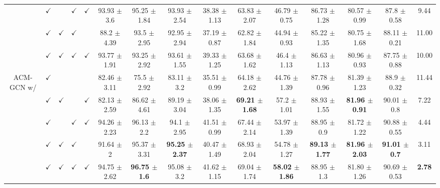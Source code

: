 \documentclass{article}
\newcommand{\0}{{\boldsymbol{0}}}
\newcommand{\6}{{\partial}}
\newcommand{\8}{{\infty}}
\newcommand{\4}{{\nabla}}
\begin{document}
\begin{table}[htbp]
\begin{tabular}{c|cccc|ccccccccc|r}
          & $\checkmark$ &       & $\checkmark$ & $\checkmark$ & 93.93 $\pm$ 3.6 & 95.25 $\pm$ 1.84 & 93.93 $\pm$ 2.54 & 38.38 $\pm$ 1.13 & 63.83 $\pm$ 2.07 & 46.79 $\pm$ 0.75 & 86.73 $\pm$ 1.28 & 80.57 $\pm$ 0.99 & 87.8 $\pm$ 0.58 & \multicolumn{1}{c}{9.44} \\
          & $\checkmark$ & $\checkmark$ & $\checkmark$ &       & 88.2 $\pm$ 4.39 & 93.5 $\pm$ 2.95 & 92.95 $\pm$ 2.94 & 37.19 $\pm$ 0.87 & 62.82 $\pm$ 1.84 & 44.94 $\pm$ 0.93 & 85.22 $\pm$ 1.35 & 80.75 $\pm$ 1.68 & 88.11 $\pm$ 0.21 & \multicolumn{1}{c}{11.00} \\
          & $\checkmark$ & $\checkmark$ & $\checkmark$ & $\checkmark$ & 93.77 $\pm$ 1.91 & 93.25 $\pm$ 2.92 & 93.61 $\pm$ 1.55 & 39.33 $\pm$ 1.25 & 63.68 $\pm$ 1.62 & 46.4 $\pm$ 1.13 & 86.63 $\pm$ 1.13 & 80.96 $\pm$ 0.93 & 87.75 $\pm$ 0.88 & \multicolumn{1}{c}{10.00} \\
          \midrule
    \multicolumn{1}{c|}{\multirow{5}[0]{*}{ACM-GCN w/}} & $\checkmark$ &       &       &       & 82.46 $\pm$ 3.11 & 75.5 $\pm$ 2.92 & 83.11 $\pm$ 3.2 & 35.51 $\pm$ 0.99 & 64.18 $\pm$ 2.62 & 44.76 $\pm$ 1.39 & 87.78 $\pm$ 0.96 & 81.39 $\pm$ 1.23 & 88.9 $\pm$ 0.32 & \multicolumn{1}{c}{11.44} \\
          & $\checkmark$ & $\checkmark$ &       & $\checkmark$ & 82.13 $\pm$ 2.59 & 86.62 $\pm$ 4.61 & 89.19 $\pm$ 3.04 & 38.06 $\pm$ 1.35 & \cellcolor[rgb]{ .816,  .808,  .808}\textbf{69.21 $\pm$ 1.68} & 57.2 $\pm$ 1.01 & 88.93 $\pm$ 1.55 & \cellcolor[rgb]{ .816,  .808,  .808}\textbf{81.96 $\pm$ 0.91} & 90.01 $\pm$ 0.8  & \multicolumn{1}{c}{7.22} \\
          & $\checkmark$ &       & $\checkmark$ & $\checkmark$ & 94.26 $\pm$ 2.23 & 96.13 $\pm$ 2.2 & 94.1 $\pm$ 2.95 & 41.51 $\pm$ 0.99 & 67.44 $\pm$ 2.14 & 53.97 $\pm$ 1.39 & 88.95 $\pm$ 0.9 & 81.72 $\pm$ 1.22 & 90.88 $\pm$ 0.55 & \multicolumn{1}{c}{4.44} \\
          & $\checkmark$ & $\checkmark$ & $\checkmark$ &       & 91.64 $\pm$ 2 & 95.37 $\pm$ 3.31 & \cellcolor[rgb]{ .816,  .808,  .808}\textbf{95.25 $\pm$ 2.37} & 40.47 $\pm$ 1.49 & 68.93 $\pm$ 2.04 & 54.78 $\pm$ 1.27 & \cellcolor[rgb]{ .816,  .808,  .808}\textbf{89.13 $\pm$ 1.77} & \cellcolor[rgb]{ .816,  .808,  .808}\textbf{81.96 $\pm$ 2.03} & \cellcolor[rgb]{ .816,  .808,  .808}\textbf{91.01 $\pm$ 0.7} & \multicolumn{1}{c}{3.11} \\
          & $\checkmark$ & $\checkmark$ & $\checkmark$ & $\checkmark$ & 94.75 $\pm$ 2.62 & \cellcolor[rgb]{ .816,  .808,  .808}\textbf{96.75 $\pm$ 1.6} & 95.08 $\pm$ 3.2 & 41.62 $\pm$ 1.15 & 69.04 $\pm$ 1.74 & \cellcolor[rgb]{ .816,  .808,  .808}\textbf{58.02 $\pm$ 1.86} & 88.95 $\pm$ 1.3 & 81.80 $\pm$ 1.26 & 90.69 $\pm$ 0.53 & \multicolumn{1}{c}{\cellcolor[rgb]{ .816,  .808,  .808}\textbf{2.78}} \\

\end{tabular}
\end{table}
\end{document}

